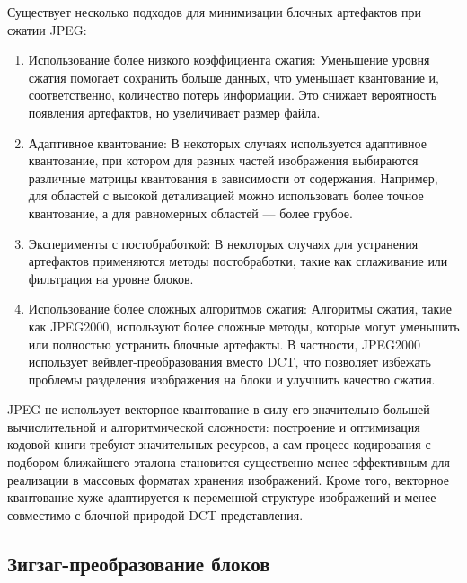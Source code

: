 Существует несколько подходов для минимизации блочных артефактов при сжатии JPEG:
\begin{enumerate}
    \item Использование более низкого коэффициента сжатия: Уменьшение уровня сжатия помогает сохранить больше данных, 
    что уменьшает квантование и, соответственно, количество потерь информации. 
    Это снижает вероятность появления артефактов, но увеличивает размер файла.

    \item Адаптивное квантование: В некоторых случаях используется адаптивное квантование, 
    при котором для разных частей изображения выбираются различные матрицы квантования в зависимости от содержания. 
    Например, для областей с высокой детализацией можно использовать более точное квантование, а для равномерных областей — более грубое.

    \item Эксперименты с постобработкой: В некоторых случаях для устранения артефактов применяются методы постобработки, такие как сглаживание или фильтрация на уровне блоков.

    \item Использование более сложных алгоритмов сжатия: Алгоритмы сжатия, такие как JPEG2000, 
    используют более сложные методы, которые могут уменьшить или полностью устранить блочные артефакты. 
    В частности, JPEG2000 использует вейвлет-преобразования вместо DCT, что позволяет избежать проблемы разделения изображения на блоки и улучшить качество сжатия.
\end{enumerate}

\vspace{1em}

JPEG не использует векторное квантование в силу его значительно большей вычислительной и алгоритмической сложности: 
построение и оптимизация кодовой книги требуют значительных ресурсов, 
а сам процесс кодирования с подбором ближайшего эталона становится существенно менее эффективным для реализации в массовых форматах хранения изображений. 
Кроме того, векторное квантование хуже адаптируется к переменной структуре изображений и менее совместимо с блочной природой DCT-представления.




\subsection{Зигзаг-преобразование блоков}

